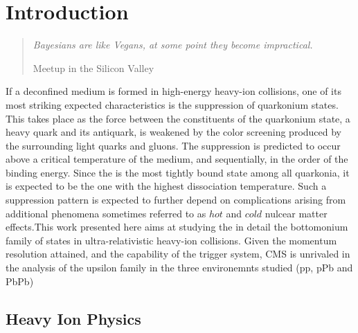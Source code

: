 %
%

\chapter{Introduction}


\begin{quote}

{\em Bayesians are like Vegans, at some point they become impractical.}

 Meetup in the Silicon Valley

\end{quote}


\noindent
 
If a deconfined medium is formed in high-energy heavy-ion collisions, one of its most striking expected characteristics is the suppression of quarkonium states.
This takes place as the force between the constituents of the quarkonium state, a heavy quark and its antiquark, is weakened by the color screening produced by the surrounding light quarks and gluons.
 The suppression is predicted to occur above a critical temperature of the medium, and sequentially, in the
order of the \QQbar binding energy. 
Since the \PgUa is the most tightly bound state among all quarkonia, it is expected to be the one
with the highest dissociation temperature. %
Such a suppression pattern is expected to further depend on complications arising from additional phenomena sometimes referred to as $hot$ and $cold$ nulcear matter effects.This work presented here aims at studying the in detail the bottomonium family of states in ultra-relativistic heavy-ion collisions.   
Given the momentum resolution attained, and the capability of the trigger system,  CMS is unrivaled in the analysis of the upsilon family in the three environemnts studied (pp, pPb and PbPb)



\section{Heavy Ion Physics}

